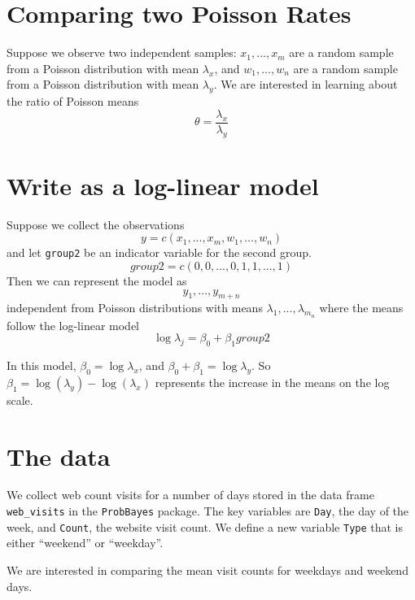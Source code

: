 \documentclass[
]{book}
\newenvironment{Shaded}{\begin{snugshade}}{\end{snugshade}}
\newcommand{\DataTypeTok}[1]{\textcolor[rgb]{0.13,0.29,0.53}{#1}}
\newcommand{\KeywordTok}[1]{\textcolor[rgb]{0.13,0.29,0.53}{\textbf{#1}}}
\newcommand{\NormalTok}[1]{#1}
\newcommand{\OperatorTok}[1]{\textcolor[rgb]{0.81,0.36,0.00}{\textbf{#1}}}
\newcommand{\StringTok}[1]{\textcolor[rgb]{0.31,0.60,0.02}{#1}}
\begin{document}
\hypertarget{comparing-two-poisson-rates}{%
\section{Comparing two Poisson Rates}\label{comparing-two-poisson-rates}}

Suppose we observe two independent samples: \(x_1, ..., x_m\) are a random sample from a Poisson distribution with mean \(\lambda_x\), and \(w_1, ..., w_n\) are a random sample from a Poisson distribution with mean \(\lambda_y\). We are interested in learning about the ratio of Poisson means
\[
\theta = \frac{\lambda_x}{\lambda_y}
\]

\hypertarget{write-as-a-log-linear-model}{%
\section{Write as a log-linear model}\label{write-as-a-log-linear-model}}

Suppose we collect the observations
\[
y = c(x_1, ..., x_m, w_1, ..., w_n)
\]
and let \texttt{group2} be an indicator variable for the second group.
\[
group2 = c(0, 0, ..., 0, 1, 1, ..., 1)
\]
Then we can represent the model as
\[
y_1, ..., y_{m+n}
\]
independent from Poisson distributions with means \(\lambda_1, ..., \lambda_{m_n}\) where the means follow the log-linear model
\[
\log \lambda_j = \beta_0 + \beta_1 group2
\]

In this model, \(\beta_0 = \log \lambda_x\), and \(\beta_0 + \beta_1 = \log \lambda_y\). So \(\beta_1 = \log(\lambda_y) - \log(\lambda_x)\) represents the increase in the means on the log scale.

\hypertarget{the-data}{%
\section{The data}\label{the-data}}

We collect web count visits for a number of days stored in the data frame \texttt{web\_visits} in the \texttt{ProbBayes} package. The key variables are \texttt{Day}, the day of the week, and \texttt{Count}, the website visit count. We define a new variable \texttt{Type} that is either ``weekend'' or ``weekday''.

We are interested in comparing the mean visit counts for weekdays and weekend days.

\begin{Shaded}
\end{Shaded}
\end{document}
